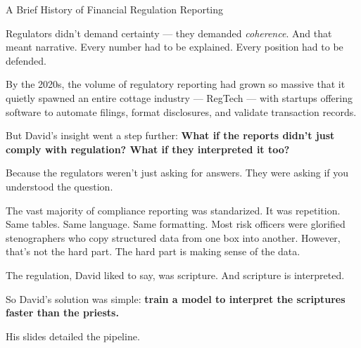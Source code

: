 \begin{HistoricalSidebar}{A Brief History of Financial Regulation Reporting}
    \medskip
    
    Regulators didn’t demand certainty — they demanded \textit{coherence}. And that meant narrative. Every 
    number had to be explained. Every position had to be defended.
    
    \medskip
    
    By the 2020s, the volume of regulatory reporting had grown so massive that it quietly spawned an entire 
    cottage industry — RegTech — with startups offering software to automate filings, format disclosures, and 
    validate transaction records.
    
    \medskip
    
    But David’s insight went a step further:
    \textbf{What if the reports didn’t just comply with regulation? What if they interpreted it too?}

    \medskip
    
    Because the regulators weren’t just asking for answers.
    They were asking if you understood the question.

\end{HistoricalSidebar}

\medskip

The vast majority of compliance reporting was standarized. It was repetition.
Same tables. Same language. Same formatting.
Most risk officers were glorified stenographers who copy structured data from one box into another.
However, that's not the hard part. The hard part is making sense of the data.

The regulation, David liked to say, was scripture.
And scripture is interpreted.

So David's solution was simple:
\textbf{train a model to interpret the scriptures faster than the priests.}

His slides detailed the pipeline.

\medskip


